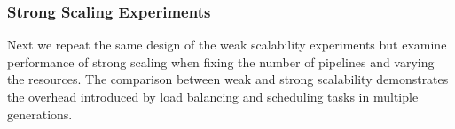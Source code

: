 






\subsubsection {Strong Scaling Experiments}

Next we repeat the same design of the weak scalability experiments but examine
performance of strong scaling when fixing the number of pipelines and varying
the resources. The comparison between weak and strong scalability demonstrates
the overhead introduced by load balancing and scheduling tasks in multiple
generations.







